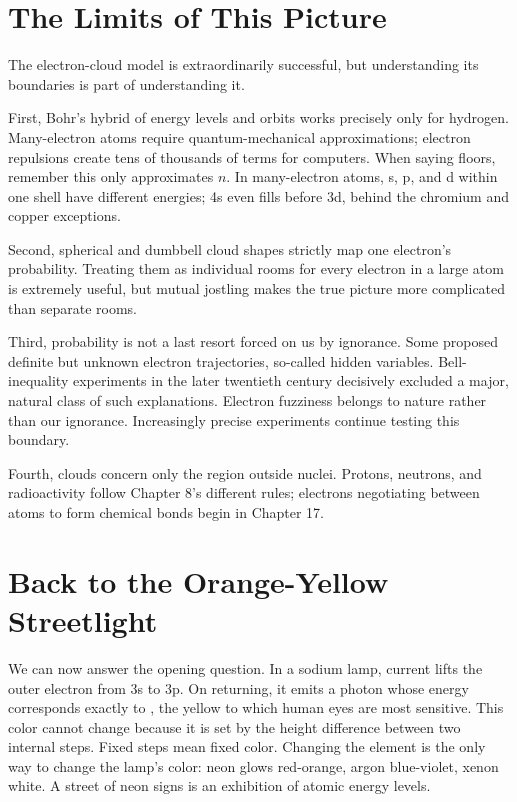 \section{The Limits of This Picture}

The electron-cloud model is extraordinarily successful, but understanding its boundaries is part of understanding it.

First, Bohr's hybrid of energy levels and orbits works precisely only for hydrogen. Many-electron atoms require quantum-mechanical approximations; electron repulsions create tens of thousands of terms for computers. When saying floors, remember this only approximates $n$. In many-electron atoms, s, p, and d within one shell have different energies; 4s even fills before 3d, behind the chromium and copper exceptions.

Second, spherical and dumbbell cloud shapes strictly map one electron's probability. Treating them as individual rooms for every electron in a large atom is extremely useful, but mutual jostling makes the true picture more complicated than separate rooms.

Third, probability is not a last resort forced on us by ignorance. Some proposed definite but unknown electron trajectories, so-called hidden variables. Bell-inequality experiments in the later twentieth century decisively excluded a major, natural class of such explanations. Electron fuzziness belongs to nature rather than our ignorance. Increasingly precise experiments continue testing this boundary.

Fourth, clouds concern only the region outside nuclei. Protons, neutrons, and radioactivity follow Chapter 8's different rules; electrons negotiating between atoms to form chemical bonds begin in Chapter 17.

\section{Back to the Orange-Yellow Streetlight}

We can now answer the opening question. In a sodium lamp, current lifts the outer electron from 3s to 3p. On returning, it emits a photon whose energy corresponds exactly to , the yellow to which human eyes are most sensitive. This color cannot change because it is set by the height difference between two internal steps. Fixed steps mean fixed color. Changing the element is the only way to change the lamp's color: neon glows red-orange, argon blue-violet, xenon white. A street of neon signs is an exhibition of atomic energy levels.

